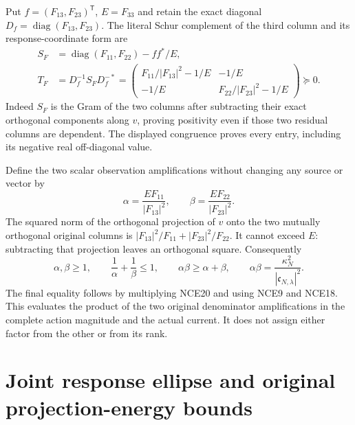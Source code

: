 Put $f=(F_{13},F_{23})^{\mathsf T}$, $E=F_{33}$ and retain the exact
diagonal $D_f=\operatorname{diag}(F_{13},F_{23})$. The literal Schur
complement of the third column and its response-coordinate form are
\[
 \begin{split}
 S_F&=\operatorname{diag}(F_{11},F_{22})-ff^*/E,\\
 T_F&=D_f^{-1}S_FD_f^{-*}
  =\begin{pmatrix}
   F_{11}/|F_{13}|^2-1/E&-1/E\\
   -1/E&F_{22}/|F_{23}|^2-1/E
   \end{pmatrix}\succeq0.
 \end{split}                                                     \tag{NCE19}
\]
Indeed $S_F$ is the Gram of the two columns after subtracting their
exact orthogonal components along $v$, proving positivity even if
those two residual columns are dependent. The displayed congruence
proves every entry, including its negative real off-diagonal value.

Define the two scalar observation amplifications without changing any
source or vector by
\[
 \alpha=\frac{E F_{11}}{|F_{13}|^2},\qquad
 \beta=\frac{E F_{22}}{|F_{23}|^2}.
 \tag{NCE20}
\]
The squared norm of the orthogonal projection of $v$ onto the two
mutually orthogonal original columns is
$|F_{13}|^2/F_{11}+|F_{23}|^2/F_{22}$. It cannot exceed $E$:
subtracting that projection leaves an orthogonal square. Consequently
\[
 \alpha,\beta\ge1,\qquad
 \frac1\alpha+\frac1\beta\le1,\qquad
 \alpha\beta\ge\alpha+\beta,
 \qquad
 \boxed{\alpha\beta=
       \frac{\kappa_N^2}{|\mathfrak c_{N,\lambda}|^2}.}
 \tag{NCE21}
\]
The final equality follows by multiplying NCE20 and using NCE9 and
NCE18. This evaluates the product of the two original denominator
amplifications in the complete action magnitude and the actual current.
It does not assign either factor from the other or from its rank.





\endgroup

\clearpage
\begingroup


\setcounter{equation}{0}
\renewcommand{\theequation}{A02JRE.\arabic{equation}}
\section*{Joint response ellipse and original projection-energy bounds}
